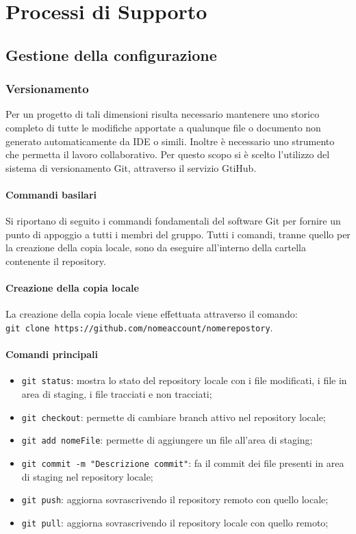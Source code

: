 \chapter{Processi di Supporto}
\section{Gestione della configurazione}
\subsection{Versionamento}
Per un progetto di tali dimensioni risulta necessario mantenere uno storico completo di tutte le modifiche apportate a qualunque file o documento non generato automaticamente da IDE o simili. Inoltre è necessario uno strumento che permetta il lavoro collaborativo. Per questo scopo si è scelto l'utilizzo del sistema di versionamento Git, attraverso il servizio GtiHub.
\subsubsection{Commandi basilari}
Si riportano di seguito i commandi fondamentali del software Git per fornire un punto di appoggio a tutti i membri del gruppo. Tutti i comandi, tranne quello per la creazione della copia locale, sono da eseguire all'interno della cartella contenente il repository.
\subsubsection{Creazione della copia locale}
La creazione della copia locale viene effettuata attraverso il comando:\\
\texttt{git clone https://github.com/nomeaccount/nomerepostory}.
\subsubsection{Comandi principali}
\begin{itemize}
	\item \texttt{git status}: mostra lo stato del repository locale con i file modificati, i file in area di staging, i file tracciati e non tracciati;
	\item \texttt{git checkout}: permette di cambiare branch attivo nel repository locale;
	\item \texttt{git add nomeFile}: permette di aggiungere un file all'area di staging;
	\item \texttt{git commit -m "Descrizione commit"}: fa il commit dei file presenti in area di staging nel repository locale;
	\item \texttt{git push}: aggiorna sovrascrivendo il repository remoto con quello locale;
	\item \texttt{git pull}: aggiorna sovrascrivendo il repository locale con quello remoto; 
\end{itemize}
